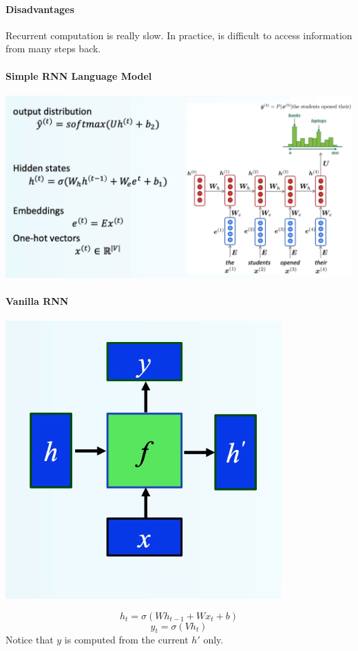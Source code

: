 \documentclass[10pt]{report}
\begin{document}
\paragraph{Disadvantages} Recurrent computation is really slow. In practice, is difficult to access information from many steps back.
\paragraph{Simple RNN Language Model}
\begin{center}
	\includegraphics[scale=0.4]{25.png}
\end{center}
\paragraph{Vanilla RNN}
\begin{center}
	\includegraphics[scale=0.5]{26.png}
\end{center}
$$h_t = \sigma\left(Wh_{t-1} + Wx_t + b\right)$$
$$y_t = \sigma\left(Vh_t\right)$$
Notice that $y$ is computed from the current $h'$ only.
\end{document}
